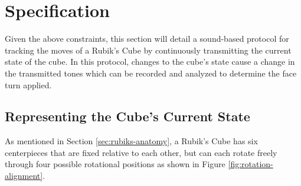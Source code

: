\section{Specification}
\label{sec:specification}
Given the above constraints, this section will detail a sound-based protocol for tracking the moves of a Rubik's Cube by continuously transmitting the current state of the cube. In this protocol, changes to the cube's state cause a change in the transmitted tones which can be recorded and analyzed to determine the face turn applied.

\subsection{Representing the Cube's Current State}
\label{subsec:representing-cube-state}
As mentioned in Section \ref{sec:rubiks-anatomy}, a Rubik's Cube has six centerpieces that are fixed relative to each other, but can each rotate freely through four possible rotational positions as shown in Figure \ref{fig:rotation-alignment}.

